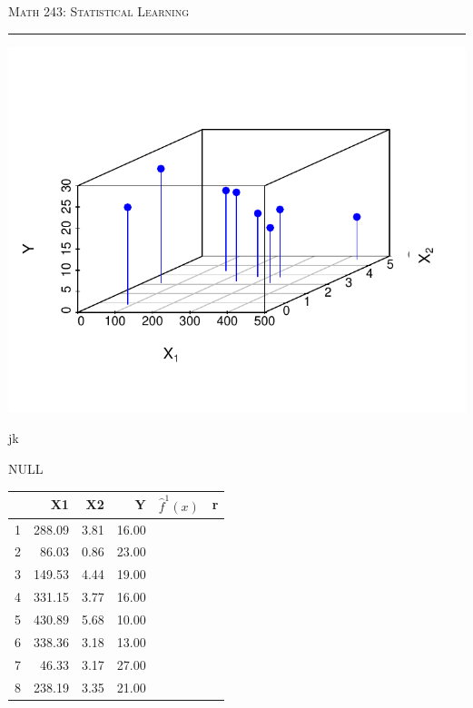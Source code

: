 \documentclass{article}\usepackage[]{graphicx}\usepackage[]{color}
\begin{document}
\begin{center}
\textsc{Math 243: Statistical Learning} \\
\noindent\rule{12cm}{0.4pt}
\end{center}

\begin{minipage}{.5\linewidth}
{\includegraphics[scale=0.6]{scatterA.pdf}}
\end{minipage}

\begin{minipage}{.5\linewidth}
jk
\end{minipage}

NULL
\begin{table}[ht]
\centering
\begin{tabular}{rrrrll}
  \hline
 & X1 & X2 & Y & $\hat{f}^1(x)$ & r \\ 
  \hline
1 & 288.09 & 3.81 & 16.00 &  &  \\ 
  2 & 86.03 & 0.86 & 23.00 &  &  \\ 
  3 & 149.53 & 4.44 & 19.00 &  &  \\ 
  4 & 331.15 & 3.77 & 16.00 &  &  \\ 
  5 & 430.89 & 5.68 & 10.00 &  &  \\ 
  6 & 338.36 & 3.18 & 13.00 &  &  \\ 
  7 & 46.33 & 3.17 & 27.00 &  &  \\ 
  8 & 238.19 & 3.35 & 21.00 &  &  \\ 
   \hline
\end{tabular}
\end{table}
\end{document}
